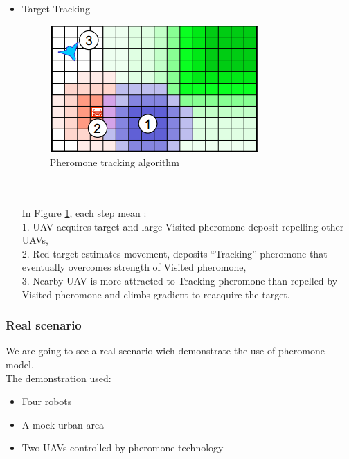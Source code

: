 \begin{itemize}
In Figure \ref{targetacquisition}, each step mean :\\
1. UAVdet detects target and Red target is created,\\
2. Red target deposits “NeedsID” pheromone, \\
3. UAVid is more attracted to NeedsID pheromone than lawn pheromone and 
climbs gradient to ID target. 
\item Target Tracking
\begin{figure}[h]
\center
\includegraphics[scale=0.7]{../images/pheromone_tracking.png}
\caption{\label{tracking} Pheromone tracking algorithm}
\end{figure}\\\\
In Figure \ref{tracking}, each step mean :\\
1. UAV acquires target and large Visited pheromone deposit repelling 
other UAVs,\\
2. Red target estimates movement, deposits “Tracking” pheromone that eventually overcomes strength of Visited pheromone, \\
3. Nearby UAV is more attracted to Tracking pheromone than repelled by Visited pheromone and climbs gradient to reacquire the target. 
\end{itemize}

\newpage
\subsubsection{Real scenario}

We are going to see a real scenario wich demonstrate the use of pheromone model.\\
The demonstration used: 
\begin{itemize}
\item Four robots 
\item A mock urban area  
\item Two UAVs controlled by pheromone technology 
\end{itemize}


